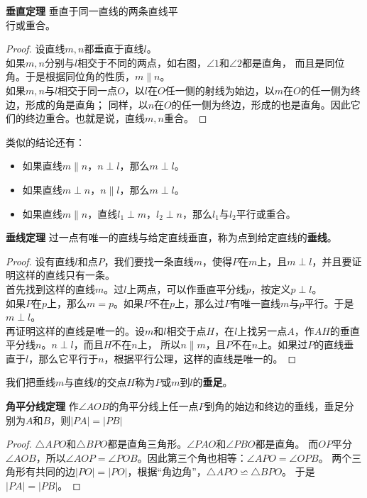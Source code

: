 \documentclass[12pt,UTF8]{ctexbook}
\begin{document}
\begin{tm}{\textbf{垂直定理}}\label{tm:3-1-0}
    垂直于同一直线的两条直线平\\
    行或重合。
\end{tm}
\begin{proof}
    设直线$m,n$都垂直于直线$l$。\\
    如果$m,n$分别与$l$相交于不同的两点，如右图，$\angle 1$和$\angle 2$都是直角，
    而且是同位角。于是根据同位角的性质，$m \parallel n$。\\
    如果$m,n$与$l$相交于同一点$O$，以$l$在$O$任一侧的射线为始边，以$m$在$O$的任一侧为终边，形成的角是直角；
    同样，以$n$在$O$的任一侧为终边，形成的也是直角。因此它们的终边重合。也就是说，直线$m,n$重合。
\end{proof}

类似的结论还有：
\begin{itemize}
    \item 如果直线$m \parallel n$，$n \perp l$，那么$m \perp l$。
    \item 如果直线$m \perp n$，$n \parallel l$，那么$m \perp l$。
    \item 如果直线$m \parallel n$，直线$l_1 \perp m$，$l_2 \perp n$，那么$l_1$与$l_2$平行或重合。
\end{itemize}
\begin{tm}{\textbf{垂线定理}}\label{tm:3-1-1}
    过一点有唯一的直线与给定直线垂直，称为点到给定直线的\textbf{垂线}。
\end{tm}
\begin{proof}
    设有直线$l$和点$P$，我们要找一条直线$m$，使得$P$在$m$上，且$m\perp l$，并且要证明这样的直线只有一条。\\
    首先找到这样的直线$m$。过$l$上两点，可以作垂直平分线$p$，按定义$p \perp l$。\\
    如果$P$在$p$上，那么$m=p$。如果$P$不在$p$上，那么过$P$有唯一直线$m$与$p$平行。于是$m\perp l$。\\
    再证明这样的直线是唯一的。设$m$和$l$相交于点$H$，在$l$上找另一点$A$，作$AH$的垂直平分线$n$。$n\perp l$，而且$H$不在$n$上，
    所以$n \parallel m$，且$P$不在$n$上。如果过$P$的直线垂直于$l$，那么它平行于$n$，根据平行公理，这样的直线是唯一的。
\end{proof}

我们把垂线$m$与直线$l$的交点$H$称为$P$或$m$到$l$的\textbf{垂足}。

\begin{tm}{\textbf{角平分线定理}}\label{tm:3-1-20}
    作$\angle AOB$的角平分线上任一点$P$到角的始边和终边的垂线，垂足分别为$A$和$B$，则$|PA| = |PB|$
\end{tm}
\begin{proof}
    $\triangle APO$和$\triangle BPO$都是直角三角形。$\angle PAO$和$\angle PBO$都是直角。
    而$OP$平分$\angle AOB$，所以$\angle AOP = \angle POB$。因此第三个角也相等：$\angle APO = \angle OPB$。
    两个三角形有共同的边$|PO| = |PO|$，根据“角边角”，$\triangle APO \backsimeq \triangle BPO$。
    于是$|PA| = |PB|$。
\end{proof}
\end{document}
